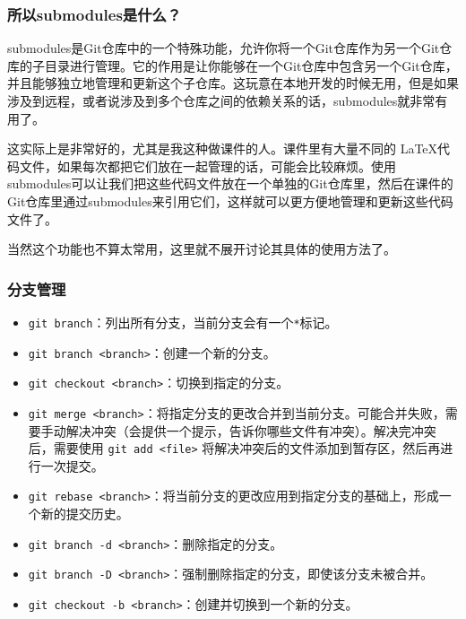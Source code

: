 \documentclass{ctexbeamer}
\begin{document}
\begin{frame}
    \frametitle{所以submodules是什么？}

    submodules是Git仓库中的一个特殊功能，允许你将一个Git仓库作为另一个Git仓库的子目录进行管理。它的作用是让你能够在一个Git仓库中包含另一个Git仓库，并且能够独立地管理和更新这个子仓库。这玩意在本地开发的时候无用，但是如果涉及到远程，或者说涉及到多个仓库之间的依赖关系的话，submodules就非常有用了。

    这实际上是非常好的，尤其是我这种做课件的人。课件里有大量不同的 \LaTeX 代码文件，如果每次都把它们放在一起管理的话，可能会比较麻烦。使用submodules可以让我们把这些代码文件放在一个单独的Git仓库里，然后在课件的Git仓库里通过submodules来引用它们，这样就可以更方便地管理和更新这些代码文件了。

    当然这个功能也不算太常用，这里就不展开讨论其具体的使用方法了。

\end{frame}

\begin{frame}
    \frametitle{分支管理}

    \begin{itemize}
        \item \texttt{git branch}：列出所有分支，当前分支会有一个\texttt{*}标记。
        \item \texttt{git branch <branch>}：创建一个新的分支。
        \item \texttt{git checkout <branch>}：切换到指定的分支。
        \item \texttt{git merge <branch>}：将指定分支的更改合并到当前分支。可能合并失败，需要手动解决冲突（会提供一个提示，告诉你哪些文件有冲突）。解决完冲突后，需要使用 \texttt{git add <file>} 将解决冲突后的文件添加到暂存区，然后再进行一次提交。
        \item \texttt{git rebase <branch>}：将当前分支的更改应用到指定分支的基础上，形成一个新的提交历史。
        \item \texttt{git branch -d <branch>}：删除指定的分支。
        \item \texttt{git branch -D <branch>}：强制删除指定的分支，即使该分支未被合并。
        \item \texttt{git checkout -b <branch>}：创建并切换到一个新的分支。
    \end{itemize}

\end{frame}
\end{document}
